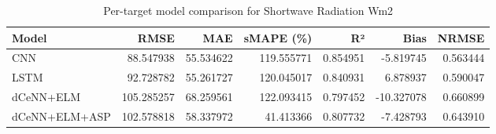 \begin{table}
\caption{Per-target model comparison for Shortwave Radiation Wm2}
\begin{tabular}{lrrrrrr}
\toprule
Model & RMSE & MAE & sMAPE (\%) & R² & Bias & NRMSE \\
\midrule
CNN & 88.547938 & 55.534622 & 119.555771 & 0.854951 & -5.819745 & 0.563444 \\
LSTM & 92.728782 & 55.261727 & 120.045017 & 0.840931 & 6.878937 & 0.590047 \\
dCeNN+ELM & 105.285257 & 68.259561 & 122.093415 & 0.797452 & -10.327078 & 0.660899 \\
dCeNN+ELM+ASP & 102.578818 & 58.337972 & 41.413366 & 0.807732 & -7.428793 & 0.643910 \\
\bottomrule
\end{tabular}
\end{table}
